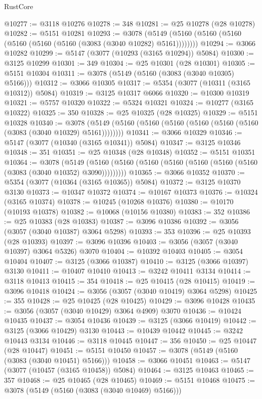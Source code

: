\begin{lexlean}{RustCore}
\begin{coremodule}
@10277 := @3118 @10276
@10278 := 348
@10281 := @25 @10278 (@28 @10278)
@10282 := @5151 @10281
@10293 := @3078 (@5149 (@5160 (@5160 (@5160 (@5160 (@5160 (@5160 (@3083 (@3040 @10282) @5161))))))))
@10294 := @3066 @10282
@10299 := @5147 (@3077 (@10293 (@3165 @10294)) @5084)
@10300 := @3125 @10299
@10301 := 349
@10304 := @25 @10301 (@28 @10301)
@10305 := @5151 @10304
@10311 := @3078 (@5149 (@5160 (@3083 (@3040 @10305) @5166)))
@10312 := @3066 @10305
@10317 := @5354 (@3077 (@10311 (@3165 @10312)) @5084)
@10319 := @3125 @10317 @6066
@10320 := @10300 @10319
@10321 := @5757 @10320
@10322 := @5324 @10321
@10324 := @10277 (@3165 @10322)
@10325 := 350
@10328 := @25 @10325 (@28 @10325)
@10329 := @5151 @10328
@10340 := @3078 (@5149 (@5160 (@5160 (@5160 (@5160 (@5160 (@5160 (@3083 (@3040 @10329) @5161))))))))
@10341 := @3066 @10329
@10346 := @5147 (@3077 (@10340 (@3165 @10341)) @5084)
@10347 := @3125 @10346
@10348 := 351
@10351 := @25 @10348 (@28 @10348)
@10352 := @5151 @10351
@10364 := @3078
    (@5149 (@5160 (@5160 (@5160 (@5160 (@5160 (@5160 (@5160 (@3083 (@3040 @10352) @3090)))))))))
@10365 := @3066 @10352
@10370 := @5354 (@3077 (@10364 (@3165 @10365)) @5084)
@10372 := @3125 @10370 @3130
@10373 := @10347 @10372
@10374 := @10167 @10373
@10376 := @10324 (@3165 @10374)
@10378 := @10245 (@10268 @10376)
@10380 := @10170 (@10193 @10378)
@10382 := @10068 (@10156 @10380)
@10383 := 352
@10386 := @25 @10383 (@28 @10383)
@10387 := @3096 @10386
@10392 := @3056 (@3057 (@3040 @10387) @3064 @5298)
@10393 := 353
@10396 := @25 @10393 (@28 @10393)
@10397 := @3096 @10396
@10403 := @3056 (@3057 (@3040 @10397) @3064 @5326) @3070
@10404 := @10392 @10403
@10405 := @3054 @10404
@10407 := @3125 (@3066 @10387)
@10410 := @3125 (@3066 @10397) @3130
@10411 := @10407 @10410
@10413 := @3242 @10411 @3134
@10414 := @3118 @10413
@10415 := 354
@10418 := @25 @10415 (@28 @10415)
@10419 := @3096 @10418
@10424 := @3056 (@3057 (@3040 @10419) @3064 @5298)
@10425 := 355
@10428 := @25 @10425 (@28 @10425)
@10429 := @3096 @10428
@10435 := @3056 (@3057 (@3040 @10429) @3064 @4909) @3070
@10436 := @10424 @10435
@10437 := @3054 @10436
@10439 := @3125 (@3066 @10419)
@10442 := @3125 (@3066 @10429) @3130
@10443 := @10439 @10442
@10445 := @3242 @10443 @3134
@10446 := @3118 @10445
@10447 := 356
@10450 := @25 @10447 (@28 @10447)
@10451 := @5151 @10450
@10457 := @3078 (@5149 (@5160 (@3083 (@3040 @10451) @5166)))
@10458 := @3066 @10451
@10463 := @5147 (@3077 (@10457 (@3165 @10458)) @5084)
@10464 := @3125 @10463
@10465 := 357
@10468 := @25 @10465 (@28 @10465)
@10469 := @5151 @10468
@10475 := @3078 (@5149 (@5160 (@3083 (@3040 @10469) @5166)))

\end{coremodule}
\end{lexlean}
